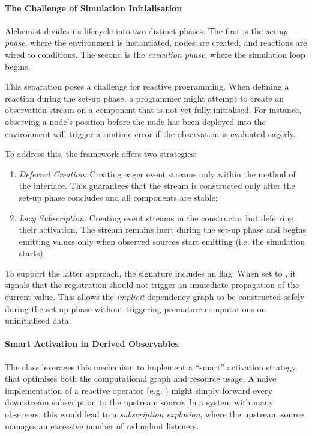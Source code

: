 \paragraph{The Challenge of Simulation
	Initialisation}\label{par:simulation_phases}
Alchemist divides its lifecycle into two distinct phases. The first is the
\emph{set-up phase}, where the environment is instantiated, nodes are created,
and reactions are wired to conditions. The second is the \emph{execution
	phase}, where the simulation loop begins.

This separation poses a challenge for reactive programming. When defining a
reaction during the set-up phase, a programmer might attempt to create an
observation stream on a component that is not yet fully initialised. For
instance, observing a node's position before the node has been deployed into
the environment will trigger a runtime error if the observation is evaluated
eagerly.

To address this, the framework offers two strategies:
\begin{enumerate}
	\item \emph{Deferred Creation:} Creating eager event streams only within
	      the \linebreak{} method of the 
	      interface. This guarantees that the stream is constructed only after the
	      set-up phase concludes and all components are stable;
	\item \emph{Lazy Subscription:} Creating event streams in the constructor
	      but deferring their activation. The stream remains inert during the
	      set-up phase and begins emitting values only when observed sources
	      start emitting (i.e. the simulation starts).
\end{enumerate}
To support the latter approach, the  signature includes an
\linebreak{} flag. When set to , it signals that
the registration should not trigger an immediate propagation of the current
value. This allows the \emph{implicit} dependency graph to be constructed
safely during the set-up phase without triggering premature computations on
uninitialised data.

\paragraph{Smart Activation in Derived Observables}
The  class leverages this mechanism to implement a
``smart'' activation strategy that optimises both the computational graph and
resource usage.
A naive implementation of a reactive operator (e.g. ) might simply
forward every downstream subscription to the upstream source. In a system with
many observers, this would lead to a \emph{subscription explosion}, where the
upstream source manages an excessive number of redundant listeners.

